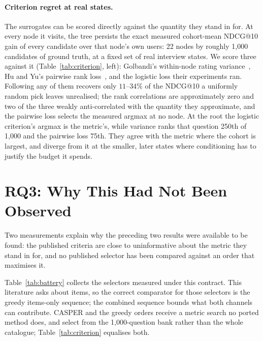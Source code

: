 \documentclass[runningheads]{llncs}
\begin{document}
\paragraph{Criterion regret at real states.}
The surrogates can be scored directly against the quantity they stand in for. At every node it
visits, the tree persists the exact measured cohort-mean NDCG@10 gain of every candidate over that
node's own users: 22 nodes by roughly 1{,}000 candidates of ground truth, at a fixed set of real
interview states. We score three against it (Table~\ref{tab:criterion}, left): Golbandi's within-node
rating variance~\cite{golbandi2011adaptive}, Hu and Yu's pairwise rank loss~\cite{hu2013interview},
and the logistic loss their experiments ran. Following any of them recovers only $11$--$34\%$ of the
NDCG@10 a uniformly random pick leaves unrealised; the rank correlations are approximately zero and
two of the three weakly anti-correlated with the quantity they approximate, and the pairwise loss
selects the measured argmax at no node. At the root the logistic criterion's argmax is the metric's,
while variance ranks that question 250th of 1{,}000 and the pairwise loss 75th. They agree with the
metric where the cohort is largest, and diverge from it at the smaller, later states where
conditioning has to justify the budget it spends.

\section{RQ3: Why This Had Not Been Observed}
\label{sec:rq3}

Two measurements explain why the preceding two results were available to be found: the published
criteria are close to uninformative about the metric they stand in for, and no published selector
has been compared against an order that maximises it.


Table~\ref{tab:battery} collects the selectors measured under this contract. This literature asks about items, so the correct
comparator for those selectors is the greedy items-only sequence; the combined sequence bounds what
both channels can contribute. CASPER and the greedy orders receive a metric search no ported method
does, and select from the 1{,}000-question bank rather than the whole catalogue;
Table~\ref{tab:criterion} equalises both.
\end{document}
